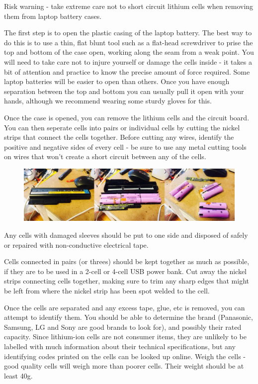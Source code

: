 \documentclass{article}
\theoremstyle{definition}
\theoremstyle{definition}
\theoremstyle{remark}
\begin{document}
    Risk warning - take extreme care not to short circuit lithium cells when removing them from laptop battery cases. 

    The first step is to open the plastic casing of the laptop battery. The best way to do this is to use a thin, flat blunt tool such as a flat-head screwdriver to prise the top and bottom of the case open, working along the seam from a weak point. You will need to take care not to injure yourself or damage the cells inside - it takes a bit of attention and practice to know the precise amount of force required. Some laptop batteries will be easier to open than others. Once you have enough separation between the top and bottom you can usually pull it open with your hands, although we recommend wearing some sturdy gloves for this.

    Once the case is opened, you can remove the lithium cells and the circuit board. You can then seperate cells into pairs or individual cells by cutting the nickel strips that connect the cells together. Before cutting any wires, identify the positive and negative sides of every cell - be sure to use any metal cutting tools on wires that won’t create a short circuit between any of the cells.

    \begin{figure}[!ht]
      \centering
      \includegraphics[width=0.75\paperwidth]{../Images/image_5_3_(battery_disassembly).png}
    \end{figure}

    Any cells with damaged sleeves should be put to one side and disposed of safely or repaired with non-conductive electrical tape.

    Cells connected in pairs (or threes) should be kept together as much as possible, if they are to be used in a 2-cell or 4-cell USB power bank. Cut away the nickel strips connecting cells together, making sure to trim any sharp edges that might be left from where the nickel strip has been spot welded to the cell.

    Once the cells are separated and any excess tape, glue, etc is removed, you can attempt to identify them. You should be able to determine the brand (Panasonic, Samsung, LG and Sony are good brands to look for), and possibly their rated capacity. Since lithium-ion cells are not consumer items, they are unlikely to be labelled with much information about their technical specifications, but any identifying codes printed on the cells can be looked up online. Weigh the cells - good quality cells will weigh more than poorer cells. Their weight should be at least 40g.
\end{document}
